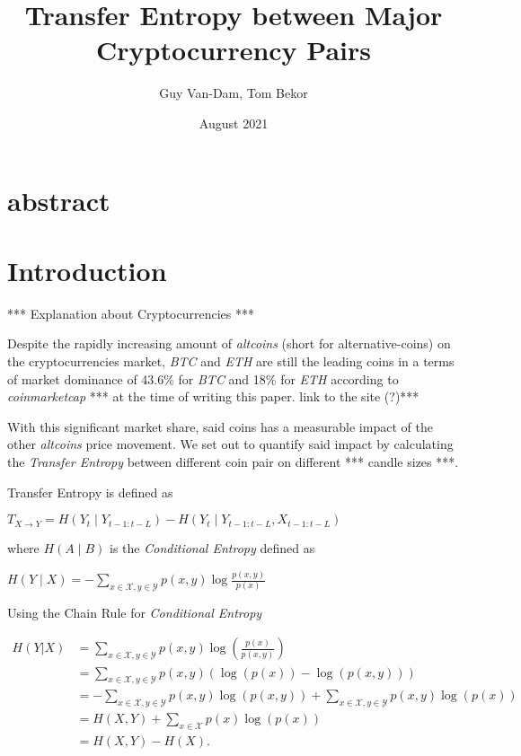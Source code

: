 \documentclass{article}
\title{Transfer Entropy between Major Cryptocurrency Pairs}
\author{Guy Van-Dam, Tom Bekor}
\date{August 2021}
\begin{document}
\maketitle

\section{abstract}
\section{Introduction}

*** Explanation about Cryptocurrencies *** 

Despite the rapidly increasing amount of \emph{altcoins} (short for alternative-coins) on the cryptocurrencies market, \emph{BTC} and \emph{ETH} are still the leading coins in a terms of market dominance of 43.6\% for \emph{BTC} and 18\% for \emph{ETH} according to \emph{coinmarketcap} *** at the time of writing this paper. link to the site (?)***

With this significant market share, said coins has a measurable impact of the other \emph{altcoins} price movement. We set out to quantify said impact by calculating the \emph{Transfer Entropy} between different coin pair on different *** candle sizes ***.

Transfer Entropy is defined as

$T_{X\rightarrow Y} = H\left( Y_t \mid Y_{t-1:t-L}\right) - H\left( Y_t \mid Y_{t-1:t-L}, X_{t-1:t-L}\right)$ 

where $H\left(A \mid B \right)$ is the \emph{Conditional Entropy} defined as 

$H\left(Y \mid X \right) = -\sum_{x\in\mathcal X, y\in\mathcal Y}p(x,y)\log \frac {p(x,y)} {p(x)}$

Using the Chain Rule for \emph{Conditional Entropy}

\begin{equation} \label{eq2}
\begin{split}
H(Y|X) &= \sum_{x\in\mathcal X, y\in\mathcal Y}p(x,y)\log \left(\frac{p(x)}{p(x,y)} \right) \\[4pt]
 &= \sum_{x\in\mathcal X, y\in\mathcal Y}p(x,y)(\log (p(x)) - \log (p(x,y))) \\[4pt]
 &= -\sum_{x\in\mathcal X, y\in\mathcal Y}p(x,y)\log (p(x,y)) + \sum_{x\in\mathcal X, y\in\mathcal Y}{p(x,y)\log(p(x))} \\[4pt]
 & = H(X,Y) + \sum_{x \in \mathcal X} p(x)\log (p(x) ) \\[4pt]
 & = H(X,Y) - H(X).
\end{split}
\end{equation}
\end{document}
